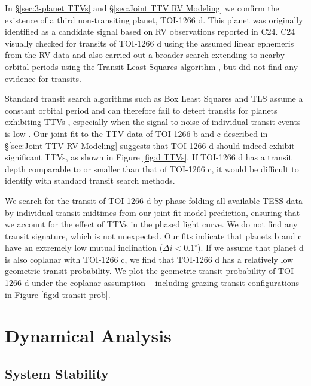 \documentclass[twocolumn]{aastex631}
\begin{document}
In \S\ref{sec:3-planet TTVs} and \S\ref{sec:Joint TTV RV Modeling} we confirm the existence of a third non-transiting planet, TOI-1266 d. This planet was originally identified as a candidate signal based on RV observations reported in C24. C24 visually checked for transits of TOI-1266 d using the assumed linear ephemeris from the RV data and also carried out a broader search extending to nearby orbital periods using the Transit Least Squares algorithm \citep[TLS,][]{tls}, but did not find any evidence for transits.

Standard transit search algorithms such as Box Least Squares \citep[BLS,][]{bls} and TLS assume a constant orbital period and can therefore fail to detect transits for planets exhibiting TTVs \citep{ttv_detection_bias}, especially when the signal-to-noise of individual transit events is low \citep[e.g.,][]{Leleu_2021}. Our joint fit to the TTV data of TOI-1266 b and c described in \S\ref{sec:Joint TTV RV Modeling} suggests that TOI-1266 d should indeed exhibit significant TTVs, as shown in Figure \ref{fig:d TTVs}. If TOI-1266 d has a transit depth comparable to or smaller than that of TOI-1266 c, it would be difficult to identify with standard transit search methods.  

We search for the transit of TOI-1266 d by phase-folding all available TESS data by individual transit midtimes from our joint fit model prediction, ensuring that we account for the effect of TTVs in the phased light curve. We do not find any transit signature, which is not unexpected. Our fits indicate that planets b and c have an extremely low mutual inclination ($\Delta i < 0.1^\circ$).  If we assume that planet d is also coplanar with TOI-1266 c, we find that TOI-1266 d has a relatively low geometric transit probability. We plot the geometric transit probability of TOI-1266 d under the coplanar assumption -- including grazing transit configurations -- in Figure \ref{fig:d transit prob}.


\section{Dynamical Analysis}  \label{sec:dynamical analysis}

\subsection{System Stability} \label{sec:rebound sims}
\end{document}
